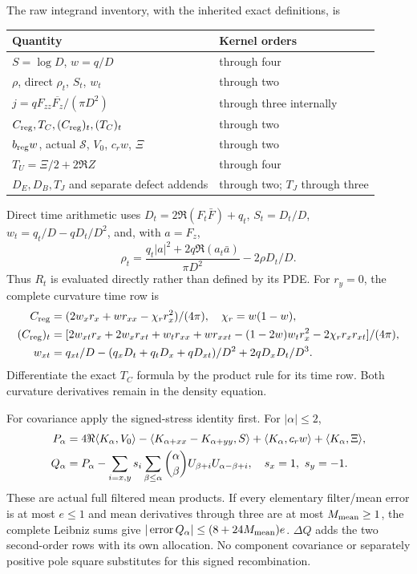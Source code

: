 The raw integrand inventory, with the inherited exact definitions, is
\begin{center}\small
\begin{tabular}{@{}>{\raggedright\arraybackslash}p{}>{\raggedright\arraybackslash}p{}@{}}\toprule
Quantity & Kernel orders\\\midrule
$S=\log D$, $w=q/D$ & through four\\
$\rho$, direct $\rho_t$, $S_t$, $w_t$ & through two\\
$j=qF_{zz}\overline{F_z}/(\pi D^2)$ & through three internally\\
$C_{\rm reg},T_C,(C_{\rm reg})_t,(T_C)_t$ & through two\\
$b_{\rm reg}w$, actual $\mathcal S$, $V_0$, $c_rw$, $\Xi$ & through two\\
$T_U=\Xi/2+2\Re Z$ & through four\\
$D_E,D_B,T_J$ and separate defect addends & through two; $T_J$ through three\\\bottomrule
\end{tabular}
\end{center}
Direct time arithmetic uses $D_t=2\Re(F_t\bar F)+q_t$,
$S_t=D_t/D$, $w_t=q_t/D-qD_t/D^2$, and, with $a=F_z$,
\begin{equation}
 \rho_t=\frac{q_t|a|^2+2q\Re(a_t\bar a)}{\pi D^2}
                         -2\rho D_t/D.
 \label{eq:ev-direct-rhot}
\end{equation}
Thus $R_t$ is evaluated directly rather than defined by its PDE.
For $r_y=0$, the complete curvature time row is
\begin{align*}
 C_{\rm reg}&=(2w_xr_x+wr_{xx}-\chi_r r_x^2)/(4\pi),\quad\chi_r=w(1-w),\\
 (C_{\rm reg})_t&=[2w_{xt}r_x+2w_xr_{xt}+w_tr_{xx}+wr_{xxt}
       -(1-2w)w_tr_x^2-2\chi_r r_xr_{xt}]/(4\pi),\\
 w_{xt}&=q_{xt}/D-(q_xD_t+q_tD_x+qD_{xt})/D^2+2qD_xD_t/D^3.
\end{align*}
Differentiate the exact $T_C$ formula by the product rule for its time
row. Both curvature derivatives remain in the density equation.

For covariance apply the signed-stress identity first. For $|\alpha|\le2$,
\begin{align}
 P_\alpha={}&4\Re\langle K_\alpha,V_0\rangle
  -\langle K_{\alpha+xx}-K_{\alpha+yy},S\rangle
  +\langle K_\alpha,c_rw\rangle+\langle K_\alpha,\Xi\rangle,\notag\\
 Q_\alpha={}&P_\alpha-\sum_{i=x,y}s_i
       \sum_{\beta\le\alpha}\binom\alpha\beta
       U_{\beta+i}U_{\alpha-\beta+i},\quad s_x=1,\ s_y=-1.
 \label{eq:ev-actual-covariance}
\end{align}
These are actual full filtered mean products. If every elementary
filter/mean error is at most $e\le1$ and mean derivatives through
three are at most $M_{\rm mean}\ge1$, the complete Leibniz sums
give $|\operatorname{error}Q_\alpha|\le(8+24M_{\rm mean})e$.
$\Delta Q$ adds the two second-order rows with its own allocation.
No component covariance or separately positive pole square substitutes
for this signed recombination.

